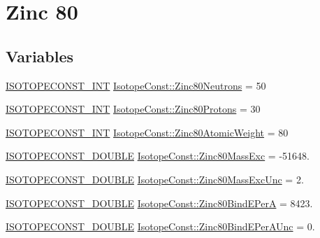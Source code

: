 \hypertarget{group___isotope_const-_zinc-_zn80}{}\section{Zinc 80}
\label{group___isotope_const-_zinc-_zn80}
\subsection*{Variables}
\begin{DoxyCompactItemize}
\item 
\mbox{\hyperlink{group___isotope_const-_macros_ga5f18360b3e99483a35c32d789e62621c}{I\+S\+O\+T\+O\+P\+E\+C\+O\+N\+S\+T\+\_\+\+I\+NT}} \mbox{\hyperlink{group___isotope_const-_zinc-_zn80_ga3b2da917191c47e967229ab4eb922d06}{Isotope\+Const\+::\+Zinc80\+Neutrons}} = 50
\item 
\mbox{\hyperlink{group___isotope_const-_macros_ga5f18360b3e99483a35c32d789e62621c}{I\+S\+O\+T\+O\+P\+E\+C\+O\+N\+S\+T\+\_\+\+I\+NT}} \mbox{\hyperlink{group___isotope_const-_zinc-_zn80_ga55b80ec712acad229140e95e7a7592aa}{Isotope\+Const\+::\+Zinc80\+Protons}} = 30
\item 
\mbox{\hyperlink{group___isotope_const-_macros_ga5f18360b3e99483a35c32d789e62621c}{I\+S\+O\+T\+O\+P\+E\+C\+O\+N\+S\+T\+\_\+\+I\+NT}} \mbox{\hyperlink{group___isotope_const-_zinc-_zn80_ga2d2f992c02b2c7ebdfcaf3fe80ec21f6}{Isotope\+Const\+::\+Zinc80\+Atomic\+Weight}} = 80
\item 
\mbox{\hyperlink{group___isotope_const-_macros_ga8f45a7272ce02c0b4c65c44636ed719a}{I\+S\+O\+T\+O\+P\+E\+C\+O\+N\+S\+T\+\_\+\+D\+O\+U\+B\+LE}} \mbox{\hyperlink{group___isotope_const-_zinc-_zn80_gaaa7361ae238e6d7082208a78fe46e8bc}{Isotope\+Const\+::\+Zinc80\+Mass\+Exc}} = -\/51648.
\item 
\mbox{\hyperlink{group___isotope_const-_macros_ga8f45a7272ce02c0b4c65c44636ed719a}{I\+S\+O\+T\+O\+P\+E\+C\+O\+N\+S\+T\+\_\+\+D\+O\+U\+B\+LE}} \mbox{\hyperlink{group___isotope_const-_zinc-_zn80_gad886c8fa5f531d17966b5b763a05107f}{Isotope\+Const\+::\+Zinc80\+Mass\+Exc\+Unc}} = 2.
\item 
\mbox{\hyperlink{group___isotope_const-_macros_ga8f45a7272ce02c0b4c65c44636ed719a}{I\+S\+O\+T\+O\+P\+E\+C\+O\+N\+S\+T\+\_\+\+D\+O\+U\+B\+LE}} \mbox{\hyperlink{group___isotope_const-_zinc-_zn80_ga93c16aca1bafe5300e5943765a30fef5}{Isotope\+Const\+::\+Zinc80\+Bind\+E\+PerA}} = 8423.
\item 
\mbox{\hyperlink{group___isotope_const-_macros_ga8f45a7272ce02c0b4c65c44636ed719a}{I\+S\+O\+T\+O\+P\+E\+C\+O\+N\+S\+T\+\_\+\+D\+O\+U\+B\+LE}} \mbox{\hyperlink{group___isotope_const-_zinc-_zn80_gab5f0574a68d3d2e986b8b88ef83f5117}{Isotope\+Const\+::\+Zinc80\+Bind\+E\+Per\+A\+Unc}} = 0.

\end{DoxyCompactItemize}
